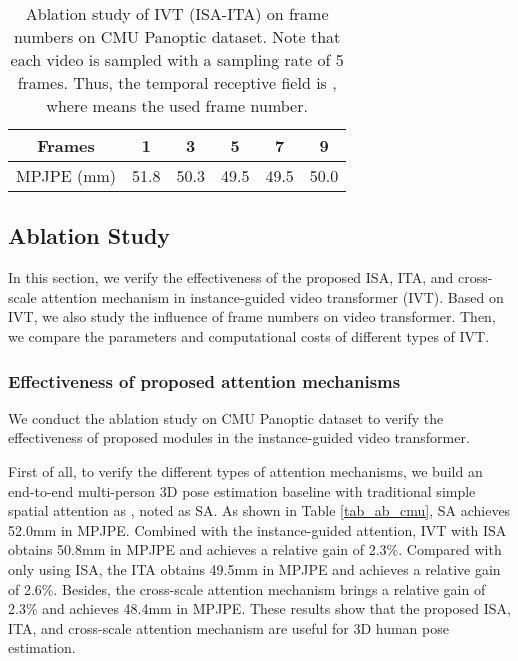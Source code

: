 \documentclass[sigconf]{acmart}
\begin{document}
\begin{table}[]
\renewcommand\tabcolsep{7pt}
\centering
 \caption{Ablation study of IVT (ISA-ITA) on frame numbers on CMU Panoptic dataset. Note that each video is sampled with a sampling rate of 5 frames. Thus, the temporal receptive field is , where  means the used frame number.}
 \vspace{-0.3cm}
\begin{tabular}{c|c|c|c|c|c}
 \hline
 
 \hline
 Frames & 1 & 3 & 5 & 7 & 9\\
 \hline
 MPJPE (mm) & 51.8 & 50.3 & 49.5 & 49.5 & 50.0\\
 \hline
 
 \hline
 \end{tabular}
\label{tab_abt}
\end{table}

\subsection{Ablation Study}
In this section, we verify the effectiveness of the proposed ISA, ITA, and cross-scale attention mechanism in instance-guided video transformer (IVT). Based on IVT, we also study the influence of frame numbers on video transformer. Then, we compare the parameters and computational costs of different types of IVT.

\subsubsection{Effectiveness of proposed attention mechanisms}
We conduct the ablation study on CMU Panoptic dataset to verify the effectiveness of proposed modules in the instance-guided video transformer. 

First of all, to verify the different types of attention mechanisms, we build an end-to-end multi-person 3D pose estimation baseline with traditional simple spatial attention as \cite{dosovitskiy2020image,bertasius2021space}, noted as SA. As shown in Table \ref{tab_ab_cmu}, SA achieves 52.0mm in MPJPE. Combined with the instance-guided attention, IVT with ISA obtains 50.8mm in MPJPE and achieves a relative gain of 2.3\%. Compared with only using ISA,  the ITA obtains 49.5mm in MPJPE and achieves a relative gain of 2.6\%. Besides, the cross-scale attention mechanism brings a relative gain of 2.3\% and achieves 48.4mm in MPJPE. These results show that the proposed ISA, ITA, and cross-scale attention mechanism are useful for 3D human pose estimation.
\end{document}
